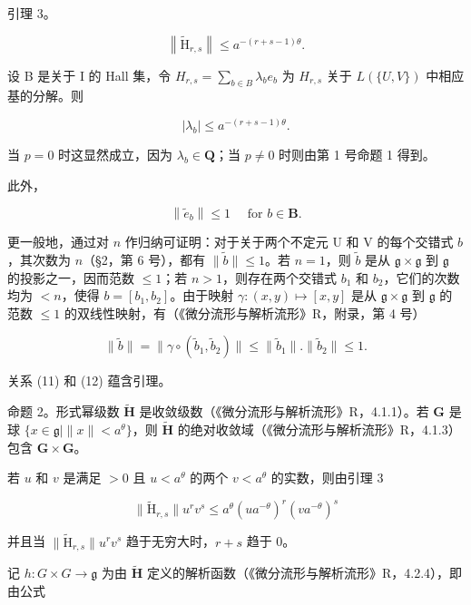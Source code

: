 引理 3。

\[
\left\| \tilde {\mathrm{H}} _ {r, s} \right\| \leqslant a ^ {- (r + s - 1) \theta}.
\]

设 B 是关于 I 的 Hall 集，令 \(H_{r,s} = \sum_{b \in B} \lambda_b e_b\) 为 \(H_{r,s}\) 关于 \(L(\{U, V\})\) 中相应基的分解。则

\[
\left| \lambda_ {b} \right| \leqslant a ^ {- (r + s - 1) \theta}.\tag{11}
\]

当 \(p = 0\) 时这显然成立，因为 \(\lambda_b \in \mathbf{Q}\)；当 \(p \neq 0\) 时则由第 1 号命题 1 得到。

此外，

\[
\left\| \tilde {e} _ {b} \right\| \leqslant 1 \quad \text { for } b \in \mathbf {B}.\tag{12}
\]

更一般地，通过对 \(n\) 作归纳可证明：对于关于两个不定元 U 和 V 的每个交错式 \(b\)，其次数为 \(n\)（§2，第 6 号），都有 \(\| \tilde{b} \| \leqslant 1\)。若 \(n = 1\)，则 \(\tilde{b}\) 是从 \(\mathfrak{g} \times \mathfrak{g}\) 到 \(\mathfrak{g}\) 的投影之一，因而范数 \(\leqslant 1\)；若 \(n > 1\)，则存在两个交错式 \(b_1\) 和 \(b_2\)，它们的次数均为 \(< n\)，使得 \(b = [b_1, b_2]\)。由于映射 \(\gamma: (x, y) \mapsto [x, y]\) 是从 \(\mathfrak{g} \times \mathfrak{g}\) 到 \(\mathfrak{g}\) 的范数 \(\leqslant 1\) 的双线性映射，有（《微分流形与解析流形》R，附录，第 4 号）

\[
\| \tilde {b} \| = \| \gamma \circ (\tilde {b} _ {1}, \tilde {b} _ {2}) \| \leqslant \| \tilde {b} _ {1} \|. \| \tilde {b} _ {2} \| \leqslant 1.\tag{13}
\]

关系 (11) 和 (12) 蕴含引理。

命题 2。形式幂级数 \(\tilde{\mathbf{H}}\) 是收敛级数（《微分流形与解析流形》R，4.1.1）。若 \(\mathbf{G}\) 是球 \(\{x\in\mathfrak{g}\mid\|x\|<a^{\theta}\}\)，则 \(\tilde{\mathbf{H}}\) 的绝对收敛域（《微分流形与解析流形》R，4.1.3）包含 \(\mathbf{G}\times\mathbf{G}\)。

若 \(u\) 和 \(v\) 是满足 \(>0\) 且 \(u < a^{\theta}\) 的两个 \(v < a^{\theta}\) 的实数，则由引理 3

\[
\| \tilde {\mathrm{H}} _ {r, s} \| u ^ {r} v ^ {s} \leqslant a ^ {\theta} (u a ^ {- \theta}) ^ {r} (v a ^ {- \theta}) ^ {s}\tag{14}
\]

并且当 \(\| \tilde{\mathrm{H}}_{r,s}\| u^r v^s\) 趋于无穷大时，\(r + s\) 趋于 0。

记 \(h \colon G \times G \to \mathfrak{g}\) 为由 \(\tilde{\mathbf{H}}\) 定义的解析函数（《微分流形与解析流形》R，4.2.4），即由公式

